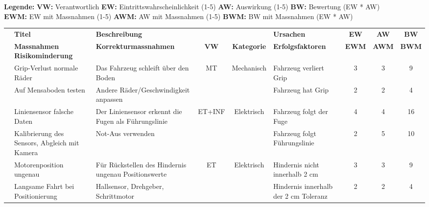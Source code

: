 \documentclass[../main.tex]{subfiles}
\begin{document}
\begin{landscape}
\newpage
\scriptsize

\textbf{Legende:}
\hspace{1cm}
\textbf{VW:} Verantwortlich
\hspace{1cm}
\textbf{EW:} Eintrittswahrscheinlichkeit (1-5)
\hspace{1cm}
\textbf{AW:} Auswirkung (1-5)
\hspace{1cm}
\textbf{BW:} Bewertung (EW * AW)
\\
\vspace{1mm} \hspace{21.5mm}
\textbf{EWM:} EW mit Massnahmen (1-5)
\hspace{1cm}
\textbf{AWM:} AW mit Massnahmen  (1-5)
\hspace{1cm}
\textbf{BWM:} BW mit Massnahmen (EW * AW)


\renewcommand{\arraystretch}{1.5} %
\begin{longtable}{|c|p{4.5cm}|p{5cm}|c|c|p{4.5cm}|c|c|c|}
\hline
\rowcolor{white}
& \textbf{Titel} & \textbf{Beschreibung} & & & \textbf{Ursachen} & \textbf{EW} & \textbf{AW} & \textbf{BW} \\ 
\cline{2-3} \cline{6-9}
\rowcolor{white}
\multirow{-2}{*}{\textbf{ID}}
& \textbf{Massnahmen Risikominderung} & \textbf{Korrekturmassnahmen} & \multirow{-2}{*}{\textbf{VW}} & \multirow{-2}{*}{\textbf{Kategorie}} & \textbf{Erfolgsfaktoren} & \textbf{EWM} & \textbf{AWM} & \textbf{BWM} \\ \hline
\endhead

\rowcolor[HTML]{F5F5F5} & Grip-Verlust normale Räder & Das Fahrzeug schleift über den Boden & MT & Mechanisch & Fahrzeug verliert Grip & 3 & 3 & 9
\\* \cline{2-3} \cline{6-9}
\rowcolor[HTML]{F5F5F5} \multirow{-2}{*}{R1} & Auf Mensaboden testen & Andere Räder/Geschwindigkeit anpassen & & & Fahrzeug hat Grip & 2 & 2 & 4 \\ \hline

\rowcolor{white} & Liniensensor falsche Daten & Der Liniensensor erkennt die Fugen als Führungslinie & ET+INF & Elektrisch & Fahrzeug folgt der Fuge & 4 & 4 & 16
\\* \cline{2-3} \cline{6-9}
\rowcolor{white} \multirow{-2}{*}{R2} & Kalibrierung des Sensors, Abgleich mit Kamera & Not-Aus verwenden & & & Fahrzeug folgt Führungslinie & 2 & 5 & 10 \\ \hline

\rowcolor[HTML]{F5F5F5} & Motorenposition ungenau & Für Rückstellen des Hindernis ungenau Positionswerte & ET & Elektrisch & Hindernis nicht innerhalb 2 cm & 3 & 3 & 9 \\* \cline{2-3} \cline{6-9}
\rowcolor[HTML]{F5F5F5} \multirow{-2}{*}{R3} & Langsame Fahrt bei Positionierung & Hallsensor, Drehgeber, Schrittmotor & & & Hindernis innerhalb der 2 cm Toleranz & 2 & 2 & 4 \\ \hline


\end{longtable}
\end{landscape}
\end{document}
